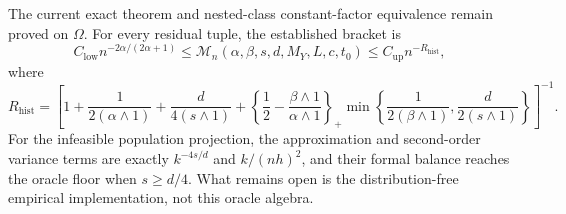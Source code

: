 The current exact theorem and nested-class constant-factor equivalence remain proved on \(\Omega\). For every residual tuple, the established bracket is
\[
C_{\mathrm{low}}n^{-2\alpha/(2\alpha+1)}
\le\mathcal M_n(\alpha,\beta,s,d,M_Y,L,c,t_0)
\le C_{\mathrm{up}}n^{-R_{\mathrm{hist}}},
\]
where
\[
R_{\mathrm{hist}}=
\left[1+\frac1{2(\alpha\wedge1)}+\frac d{4(s\wedge1)}+
\left\{\frac12-\frac{\beta\wedge1}{\alpha\wedge1}\right\}_+
\min\left\{\frac1{2(\beta\wedge1)},\frac d{2(s\wedge1)}\right\}\right]^{-1}.
\]
For the infeasible population projection, the approximation and second-order variance terms are exactly \(k^{-4s/d}\) and \(k/(nh)^2\), and their formal balance reaches the oracle floor when \(s\ge d/4\). What remains open is the distribution-free empirical implementation, not this oracle algebra.